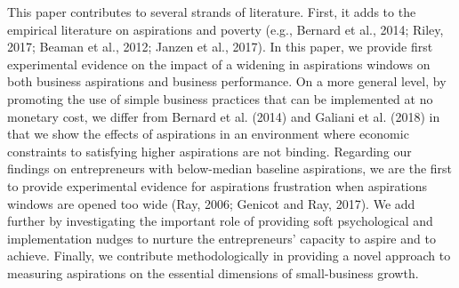 \documentclass[11.5pt]{article}
\begin{document}
This paper contributes to several strands of literature. First, it adds to the empirical literature on aspirations and poverty (e.g., Bernard et al., 2014; Riley, 2017; Beaman et al., 2012; Janzen et al., 2017). %
In this paper, we provide first experimental evidence on the impact of a widening in aspirations windows on both business aspirations and business performance. On a more general level, by promoting the use of simple business practices that can be implemented at no monetary cost, we differ from Bernard et al. (2014) and Galiani et al. (2018) in that we show the effects of aspirations in an environment where economic constraints to satisfying higher aspirations are not binding. Regarding our findings on entrepreneurs with below-median baseline aspirations, we are the first to provide experimental evidence for aspirations frustration when aspirations windows are opened too wide (Ray, 2006; Genicot and Ray, 2017). We add further by investigating the important role of providing soft psychological and implementation nudges to nurture the entrepreneurs' capacity to aspire and to achieve. Finally, we contribute methodologically in providing a novel approach to measuring aspirations on the essential dimensions of small-business growth.
\end{document}
